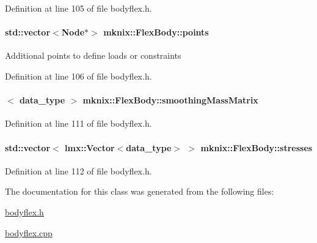 Definition at line 105 of file bodyflex.\+h.

\hypertarget{classmknix_1_1_flex_body_a6805771d1303a0ecde2d804d93f59575}{}
\paragraph[{points}]{\setlength{\rightskip}{0pt plus 5cm}std\+::vector$<${\bf Node}$\ast$$>$ mknix\+::\+Flex\+Body\+::points\hspace{0.3cm}{\ttfamily [protected]}}\label{classmknix_1_1_flex_body_a6805771d1303a0ecde2d804d93f59575}
Additional points to define loads or constraints 

Definition at line 106 of file bodyflex.\+h.

\hypertarget{classmknix_1_1_flex_body_a39cbb448870d5dee6fcc02362bec9940}{}
\paragraph[{smoothing\+Mass\+Matrix}]{$<$ {\bf data\+\_\+type} $>$ mknix\+::\+Flex\+Body\+::smoothing\+Mass\+Matrix\hspace{0.3cm}{\ttfamily [protected]}}\label{classmknix_1_1_flex_body_a39cbb448870d5dee6fcc02362bec9940}


Definition at line 111 of file bodyflex.\+h.

\hypertarget{classmknix_1_1_flex_body_aa3ee6a81c465127e810ec9cec2f3ab58}{}
\paragraph[{stresses}]{\setlength{\rightskip}{0pt plus 5cm}std\+::vector$<$ {\bf lmx\+::\+Vector}$<${\bf data\+\_\+type}$>$ $>$ mknix\+::\+Flex\+Body\+::stresses\hspace{0.3cm}{\ttfamily [protected]}}\label{classmknix_1_1_flex_body_aa3ee6a81c465127e810ec9cec2f3ab58}


Definition at line 112 of file bodyflex.\+h.



The documentation for this class was generated from the following files\+:\begin{DoxyCompactItemize}
\item 
\hyperlink{bodyflex_8h}{bodyflex.\+h}\item 
\hyperlink{bodyflex_8cpp}{bodyflex.\+cpp}\end{DoxyCompactItemize}
